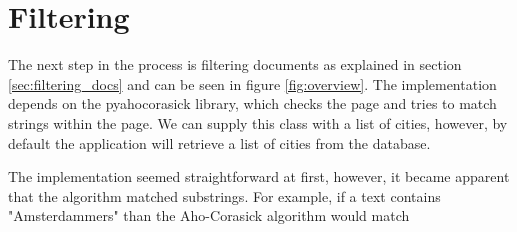 \section{Filtering}
The next step in the process is filtering documents as explained in section \ref{sec:filtering_docs} and can be seen in figure \ref{fig:overview}. The implementation depends on the pyahocorasick library, which checks the page and tries to match strings within the page. We can supply this class with a list of cities, however, by default the application will retrieve a list of cities from the database.

The implementation seemed straightforward at first, however, it became apparent that the algorithm matched substrings. For example, if a text contains "Amsterdammers" than the Aho-Corasick algorithm would match

